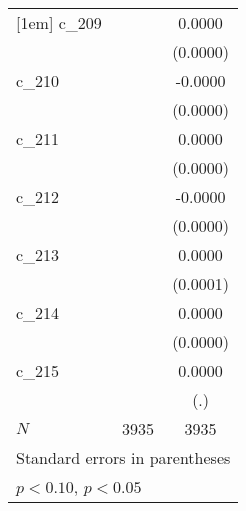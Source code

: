 {\begin{tabular}{l*{2}{c}}
[1em]
c\_209       &                    &      0.0000        \\
            &                    &    (0.0000)        \\
[1em]
c\_210       &                    &     -0.0000        \\
            &                    &    (0.0000)        \\
[1em]
c\_211       &                    &      0.0000        \\
            &                    &    (0.0000)        \\
[1em]
c\_212       &                    &     -0.0000        \\
            &                    &    (0.0000)        \\
[1em]
c\_213       &                    &      0.0000        \\
            &                    &    (0.0001)        \\
[1em]
c\_214       &                    &      0.0000        \\
            &                    &    (0.0000)        \\
[1em]
c\_215       &                    &      0.0000        \\
            &                    &         (.)        \\
\hline
\(N\)       &        3935        &        3935        \\
\hline\hline
\multicolumn{3}{l}{\footnotesize Standard errors in parentheses}\\
\multicolumn{3}{l}{\footnotesize \sym{*} \(p<0.10\), \sym{**} \(p<0.05\)}\\
\end{tabular}
}
